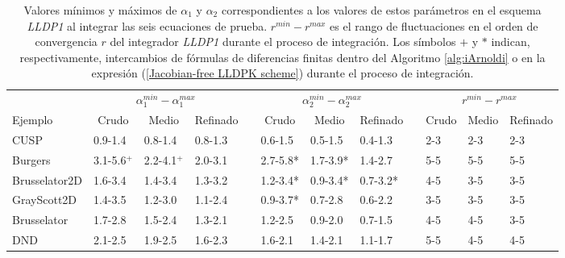 \begin{table}
	\caption{Valores mínimos y máximos de $\alpha _{1}$ y $\alpha _{2}$ correspondientes a los valores de estos parámetros en el esquema \emph{LLDP1} al integrar las seis ecuaciones de prueba. $r^{min}-r^{max}$ es el rango de fluctuaciones en el orden de convergencia $r$ del integrador \emph{LLDP1} durante el proceso de integración. Los símbolos $+$ y $*$ indican, respectivamente, intercambios de fórmulas de diferencias finitas dentro del Algoritmo \ref{alg:iArnoldi} o en la expresión (\ref{Jacobian-free LLDPK scheme}) durante el proceso de integración.}
	\label{tab:R_LLDP1}
	\begin{adjustbox}{width=0.95\columnwidth,center}
		\begin{tabular}{lccccccccccc}
			& \multicolumn{3}{c}{$\alpha^{min}_{1}-\alpha^{max}_{1}$} &  & \multicolumn{3}{c}{$\alpha^{min}_{2}-\alpha^{max}_{2}$} &  & \multicolumn{3}{c}{$r^{min}-r^{max}$} \\
			\cline{2-4}\cline{6-8}\cline{10-12} Ejemplo & Crudo & Medio & Refinado &  & Crudo & Medio & Refinado &  & Crudo & Medio & Refinado \\
			\hline
			CUSP & \multicolumn{1}{l}{0.9-1.4} & \multicolumn{1}{l}{0.8-1.4} & \multicolumn{1}{l}{0.8-1.3} &  & \multicolumn{1}{l}{0.6-1.5} & \multicolumn{1}{l}{0.5-1.5} & \multicolumn{1}{l}{0.4-1.3} &  & \multicolumn{1}{l}{2-3} & \multicolumn{1}{l}{2-3} & \multicolumn{1}{l}{2-3} \\
			Burgers & \multicolumn{1}{l}{3.1-5.6$^+$} & \multicolumn{1}{l}{2.2-4.1$^+$} & \multicolumn{1}{l}{2.0-3.1} &  & \multicolumn{1}{l}{2.7-5.8*} & \multicolumn{1}{l}{1.7-3.9*} & \multicolumn{1}{l}{1.4-2.7} &  & \multicolumn{1}{l}{5-5} & \multicolumn{1}{l}{5-5} & \multicolumn{1}{l}{5-5} \\
			Brusselator2D & \multicolumn{1}{l}{1.6-3.4} & \multicolumn{1}{l}{1.4-3.4} & \multicolumn{1}{l}{1.3-3.2} &  & \multicolumn{1}{l}{1.2-3.4*} & \multicolumn{1}{l}{0.9-3.4*} & \multicolumn{1}{l}{0.7-3.2*} &  & \multicolumn{1}{l}{4-5} & \multicolumn{1}{l}{3-5} & \multicolumn{1}{l}{3-5} \\
			GrayScott2D & \multicolumn{1}{l}{1.4-3.5} & \multicolumn{1}{l}{1.2-3.0} & \multicolumn{1}{l}{1.1-2.4} &  & \multicolumn{1}{l}{0.9-3.7*} & \multicolumn{1}{l}{0.7-2.8} & \multicolumn{1}{l}{0.6-2.2} &  & \multicolumn{1}{l}{3-5} & \multicolumn{1}{l}{3-5} & \multicolumn{1}{l}{3-5} \\
			Brusselator & \multicolumn{1}{l}{1.7-2.8} & \multicolumn{1}{l}{1.5-2.4} & \multicolumn{1}{l}{1.3-2.1} &  & \multicolumn{1}{l}{1.2-2.5} & \multicolumn{1}{l}{0.9-2.0} & \multicolumn{1}{l}{0.7-1.5} &  & \multicolumn{1}{l}{4-5} & \multicolumn{1}{l}{4-5} & \multicolumn{1}{l}{3-5} \\
			DND & \multicolumn{1}{l}{2.1-2.5} & \multicolumn{1}{l}{1.9-2.5} & \multicolumn{1}{l}{1.6-2.3} &  & \multicolumn{1}{l}{1.6-2.1} & \multicolumn{1}{l}{1.4-2.1} & \multicolumn{1}{l}{1.1-1.7} &  & \multicolumn{1}{l}{5-5} & \multicolumn{1}{l}{4-5} & \multicolumn{1}{l}{4-5} \\
			\hline
		\end{tabular}
	\end{adjustbox}
\end{table}


